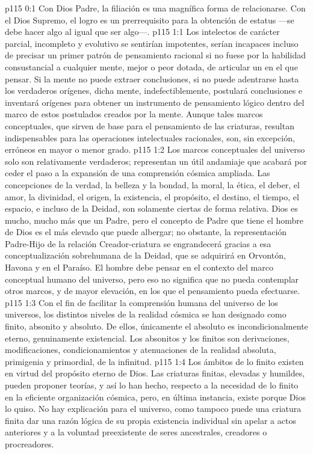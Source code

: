 \author{Mensajero poderoso}
\vs p115 0:1 Con Dios Padre, la filiación es una magnífica forma de relacionarse. Con el Dios Supremo, el logro es un prerrequisito para la obtención de estatus ---se debe hacer algo al igual que ser algo---.
\vs p115 1:1 Los intelectos de carácter parcial, incompleto y evolutivo se sentirían impotentes, serían incapaces incluso de precisar un primer patrón de pensamiento racional si no fuese por la habilidad consustancial a cualquier mente, mejor o peor dotada, de articular un  en el que pensar. Si la mente no puede extraer conclusiones, si no puede adentrarse hasta los verdaderos orígenes, dicha mente, indefectiblemente, postulará conclusiones e inventará orígenes para obtener un instrumento de pensamiento lógico dentro del marco de estos postulados creados por la mente. Aunque tales marcos conceptuales, que sirven de base para el pensamiento de las criaturas, resultan indispensables para las operaciones intelectuales racionales, son, sin excepción, erróneos en mayor o menor grado.
\vs p115 1:2 Los marcos conceptuales del universo solo son relativamente verdaderos; representan un útil andamiaje que acabará por ceder el paso a la expansión de una comprensión cósmica ampliada. Las concepciones de la verdad, la belleza y la bondad, la moral, la ética, el deber, el amor, la divinidad, el origen, la existencia, el propósito, el destino, el tiempo, el espacio, e incluso de la Deidad, son solamente ciertas de forma relativa. Dios es mucho, mucho más que un Padre, pero el concepto de Padre que tiene el hombre de Dios es el más elevado que puede albergar; no obstante, la representación Padre\hyp{}Hijo de la relación Creador\hyp{}criatura se engrandecerá gracias a esa conceptualización sobrehumana de la Deidad, que se adquirirá en Orvontón, Havona y en el Paraíso. El hombre debe pensar en el contexto del marco conceptual humano del universo, pero eso no significa que no pueda contemplar otros marcos, y de mayor elevación, en los que el pensamiento pueda efectuarse.
\vs p115 1:3 Con el fin de facilitar la comprensión humana del universo de los universos, los distintos niveles de la realidad cósmica se han designado como finito, absonito y absoluto. De ellos, únicamente el absoluto es incondicionalmente eterno, genuinamente existencial. Los absonitos y los finitos son derivaciones, modificaciones, condicionamientos y atenuaciones de la realidad absoluta, primigenia y primordial, de la infinitud.
\vs p115 1:4 Los ámbitos de lo finito existen en virtud del propósito eterno de Dios. Las criaturas finitas, elevadas y humildes, pueden proponer teorías, y así lo han hecho, respecto a la necesidad de lo finito en la eficiente organización cósmica, pero, en última instancia, existe porque Dios lo quiso. No hay explicación para el universo, como tampoco puede una criatura finita dar una razón lógica de su propia existencia individual sin apelar a actos anteriores y a la voluntad preexistente de seres ancestrales, creadores o procreadores.
